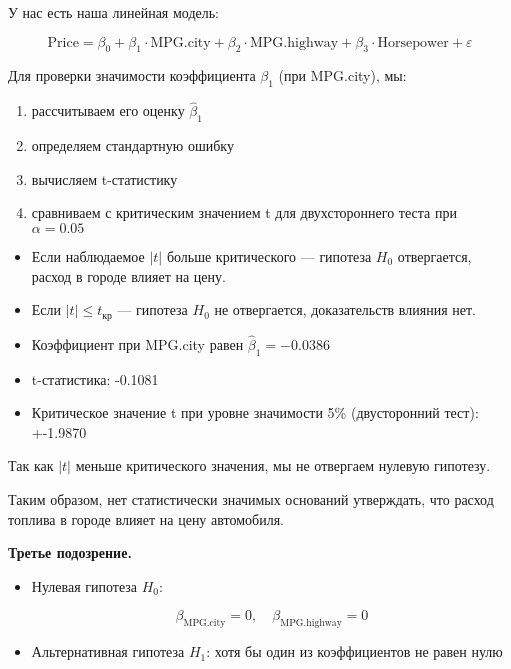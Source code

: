 \documentclass[12pt]{article}
\begin{document}
	У нас есть наша линейная модель:
	
	$$
	\text{Price} = \beta_0 + \beta_1 \cdot \text{MPG.city} + \beta_2 \cdot \text{MPG.highway} + \beta_3 \cdot \text{Horsepower} + \varepsilon
	$$
	
	Для проверки значимости коэффициента $\beta_1$ (при MPG.city), мы:
	
	\begin{enumerate}
		\item рассчитываем его оценку $\hat{\beta}_1$
		\item определяем стандартную ошибку
		\item вычисляем t-статистику
		\item сравниваем с критическим значением t для двухстороннего теста при $\alpha = 0.05$
	\end{enumerate}
	
	\begin{itemize}
		\item Если наблюдаемое $|t|$ больше критического — гипотеза $H_0$ отвергается, расход в городе влияет на цену.
		
		\item Если $|t| \le t_{\text{кр}}$ — гипотеза $H_0$ не отвергается, доказательств влияния нет.
		
		\item Коэффициент при MPG.city равен $\hat{\beta}_1 = -0.0386$
		
		\item t-статистика: -0.1081
		
		\item Критическое значение t при уровне значимости 5\% (двусторонний тест): +-1.9870
	\end{itemize}
	
	Так как $|t|$ меньше критического значения, мы не отвергаем нулевую гипотезу.
	
	Таким образом, нет статистически значимых оснований утверждать, что расход топлива в городе влияет на цену автомобиля.
	\vspace*{2em}
	
	\textbf{Третье подозрение.}
	
	\begin{itemize}
		\item Нулевая гипотеза $H_0$:
		
		$$ \beta_{\text{MPG.city}} = 0,\quad \beta_{\text{MPG.highway}} = 0 $$
		
		\item Альтернативная гипотеза $H_1$: хотя бы один из коэффициентов не равен нулю
	\end{itemize}
	
\end{document}
